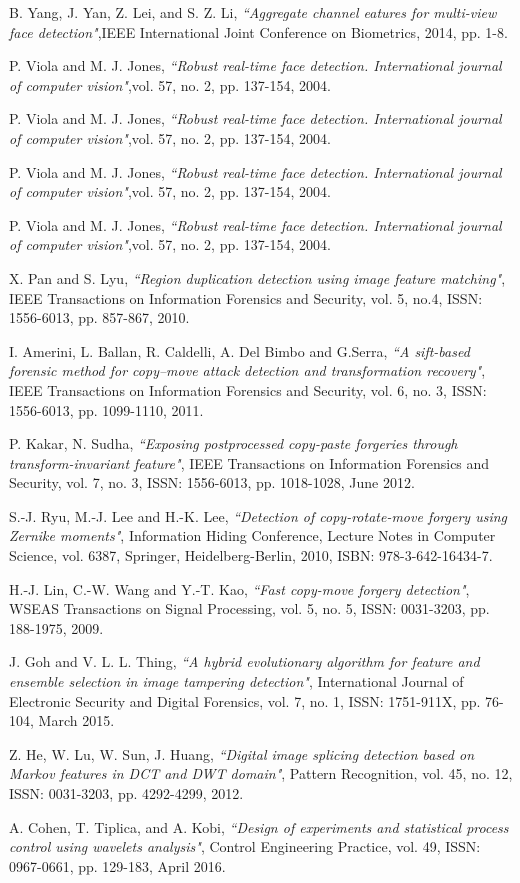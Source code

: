 B. Yang, J. Yan, Z. Lei, and S. Z. Li,
\textit{``Aggregate channel eatures for multi-view face detection"},IEEE International Joint Conference on Biometrics, 
2014, pp. 1-8.

P. Viola and M. J. Jones,
\textit{``Robust real-time face detection. International journal of computer vision"},vol. 57, no. 2, pp. 137-154, 2004.

P. Viola and M. J. Jones,
\textit{``Robust real-time face detection. International journal of computer vision"},vol. 57, no. 2, pp. 137-154, 2004.

P. Viola and M. J. Jones,
\textit{``Robust real-time face detection. International journal of computer vision"},vol. 57, no. 2, pp. 137-154, 2004.

P. Viola and M. J. Jones,
\textit{``Robust real-time face detection. International journal of computer vision"},vol. 57, no. 2, pp. 137-154, 2004.

X. Pan and S. Lyu,
\textit{``Region duplication detection using image feature matching"},
IEEE Transactions on Information Forensics and Security,
vol. 5, no.4, ISSN: 1556-6013, pp. 857-867, 2010.
	
I. Amerini, L. Ballan, R. Caldelli, A. Del Bimbo and G.Serra,
\textit{``A sift-based forensic method for copy–move attack detection and transformation recovery"},
IEEE Transactions on Information Forensics and Security,
vol. 6, no. 3, ISSN: 1556-6013, pp. 1099-1110, 2011.

P. Kakar, N. Sudha,
\textit{``Exposing postprocessed copy-paste forgeries through transform-invariant feature"},
IEEE Transactions on Information Forensics and Security,
vol. 7, no. 3, ISSN: 1556-6013, pp. 1018-1028, June 2012.

S.-J. Ryu, M.-J. Lee and H.-K. Lee,
\textit{``Detection of copy-rotate-move forgery using Zernike moments"},
Information Hiding Conference, Lecture Notes in Computer Science, vol. 6387, Springer,
Heidelberg-Berlin, 2010, ISBN: 978-3-642-16434-7.

H.-J. Lin, C.-W. Wang and Y.-T. Kao,
\textit{``Fast copy-move forgery detection"},
WSEAS Transactions on Signal Processing,
vol. 5, no. 5, ISSN: 0031-3203, pp. 188-1975, 2009.

J. Goh and V. L. L. Thing,
\textit{``A hybrid evolutionary algorithm for feature and ensemble selection in image tampering detection"},
International Journal of Electronic Security and Digital Forensics,
vol. 7, no. 1, ISSN: 1751-911X, pp. 76-104, March 2015.

Z. He, W. Lu, W. Sun, J. Huang,
\textit{``Digital image splicing detection based on Markov features in DCT and DWT domain"},
Pattern Recognition, vol. 45, no. 12, ISSN: 0031-3203, pp. 4292-4299, 2012.

A. Cohen, T. Tiplica, and A. Kobi,
\textit{``Design of experiments and statistical process control using wavelets analysis"},
Control Engineering Practice,
vol. 49, ISSN: 0967-0661, pp. 129-183, April 2016.